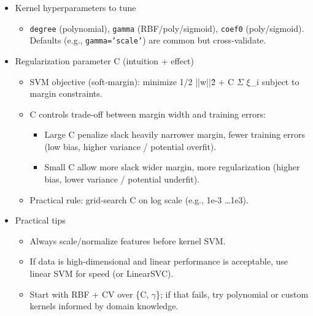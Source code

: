 \begin{framed}
\begin{itemize}
\begin{itemize}
\item Custom kernels: allowed but must be positive semi‑definite (Mercer) for SVM guarantees.
\end{itemize}


\item Kernel hyperparameters to tune

\begin{itemize}
\item \texttt{degree} (polynomial), \texttt{gamma} (RBF/poly/sigmoid), \texttt{coef0} (poly/sigmoid). Defaults (e.g., \texttt{gamma='scale'}) are common but cross‑validate.
\end{itemize}


\item Regularization parameter C (intuition + effect)

\begin{itemize}
\item SVM objective (soft‑margin): minimize 1/2 ||w||\^2 + C $\Sigma$ $\xi$\_i  subject to margin constraints.
\item C controls trade‑off between margin width and training errors:

\begin{itemize}
\item Large C \rightarrow penalize slack heavily \rightarrow narrower margin, fewer training errors (low bias, higher variance / potential overfit).
\item Small C \rightarrow allow more slack \rightarrow wider margin, more regularization (higher bias, lower variance / potential underfit).
\end{itemize}


\item Practical rule: grid‑search C on log scale (e.g., 1e-3 \dots 1e3).
\end{itemize}


\item Practical tips

\begin{itemize}
\item Always scale/normalize features before kernel SVM.
\item If data is high‑dimensional and linear performance is acceptable, use linear SVM for speed (or LinearSVC).
\item Start with RBF + CV over \{C, $\gamma$\}; if that fails, try polynomial or custom kernels informed by domain knowledge.
\end{itemize}
\end{itemize}
\end{framed}

